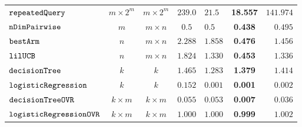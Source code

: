 {\begin {table}[H]
\begin{center}
{\begin{tabular}{|| >{\tiny}l || c | c || c || l | c | r ||  }
         \hhline{||-||--||-||---||}
         $\mathtt{repeatedQuery}$~\cite{Jamieson2015TheAO} & $ m \times 2^m $ & $  m \times 2^m $ & $239.0$   & $21.5$ & {\textbf{18.557}} & $141.974$  \\
         \hhline{||-||--||-||---||}
         $\mathtt{nDimPairwise}$~\cite{Jamieson2015TheAO} & $ m $ & $  m \times n  $ & $0.5$   & $0.5$ & {\textbf{ 0.438}} & {$0.495$}  \\
         \hhline{||-||--||-||---||}
         $\mathtt{bestArm}$~\cite{Jamieson2015TheAO} & $ n $ & $  m \times n $ & $ 2.288$   & $ 1.858$ & {\textbf{0.476}} & $ 1.456$  \\
         \hhline{||-||--||-||---||}
         $\mathtt{lilUCB}$~\cite{Jamieson2015TheAO} & $ n $ & $ m \times n $ & $1.824$   & $ 1.330$ & {\textbf{0.453}} & $ 1.336$  \\
         \hhline{||-||--||-||---||}
         $\mathtt{decisionTree}$ & $k$ &  $k$ & $ 1.465$  & $ 1.283$ & \textbf{1.379 } & {$1.414$}  \\
         \hhline{||-||--||-||---||}
         $  \mathtt{logisticRegression}$ & $k$ &  $k$ & $ 0.152$  &  $ 0.001$ & {\textbf{0.001}} & {$0.002$}   \\
        \hhline{||-||--||-||---||}
        $  \mathtt{decisionTreeOVR}$ & $k \times m$ &  $ k \times m $ &  $0.055$ & $0.053$  &  {\textbf{0.007}} & $0.036$  \\
        \hhline{||-||--||-||---||}
        $  \mathtt{logisticRegressionOVR}$    & $k \times m$ &  $ k \times m $ &  $ 1.000  $  &  $ 1.000 $ & {\textbf{ 0.999}} & $ 1.002 $ \\

\end{tabular}}
\end{center}
\end{table}}
